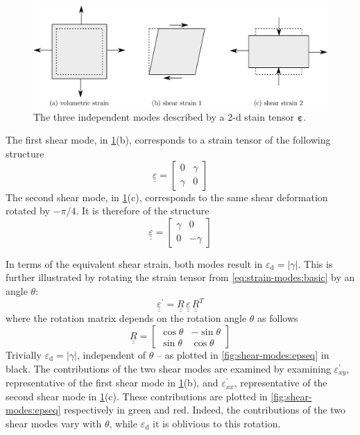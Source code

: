 \documentclass[fleqn]{goose-article}
\newcommand\T[1]{\underline{\bm{{#1}}}}
\begin{document}
\begin{figure}[htp]
    \centering
    \includegraphics[width=.7\textwidth]{figures/strain-modes_2d}
    \caption{The three independent modes described by a 2-d stain tensor $\T{\varepsilon}$.}
    \label{fig:strain-modes:2d}
\end{figure}

The first shear mode, in \cref{fig:strain-modes:2d}(b),
corresponds to a strain tensor of the following structure
\begin{equation}
    \label{eq:strain-modes:basic}
    \underline{\underline{\varepsilon}}
    =
    \begin{bmatrix}
        0 & \gamma \\
        \gamma & 0
    \end{bmatrix}
\end{equation}
The second shear mode, in \cref{fig:strain-modes:2d}(c),
corresponds to the same shear deformation rotated by $-\pi/4$.
It is therefore of the structure
\begin{equation}
    \underline{\underline{\varepsilon}}
    =
    \begin{bmatrix}
        \gamma & 0 \\
         0 & -\gamma
    \end{bmatrix}
\end{equation}

In terms of the equivalent shear strain, both modes result in $\varepsilon_\mathrm{d} = |\gamma|$.
This is further illustrated by rotating the strain tensor
from \cref{eq:strain-modes:basic} by an angle $\theta$:
\begin{equation}
    \underline{\underline{\varepsilon}}^\prime
    =
    \underline{\underline{R}} \,
    \underline{\underline{\varepsilon}} \,
    \underline{\underline{R}}^T
\end{equation}
where the rotation matrix depends on the rotation angle $\theta$ as follows
\begin{equation}
    \underline{\underline{R}}
    =
    \begin{bmatrix}
        \cos \theta & - \sin \theta \\
        \sin \theta & \cos \theta
    \end{bmatrix}
\end{equation}
Trivially $\varepsilon_\mathrm{d} = | \gamma |$, independent of $\theta$ --
as plotted in \cref{fig:shear-modes:epseq} in black.
The contributions of the two shear modes are examined by examining $\varepsilon^\prime_{xy}$,
representative of the first shear mode in \cref{fig:strain-modes:2d}(b),
and $\varepsilon^\prime_{xx}$,
representative of the second shear mode in \cref{fig:strain-modes:2d}(c).
These contributions are plotted in \cref{fig:shear-modes:epseq} respectively in green and red.
Indeed, the contributions of the two shear modes vary with $\theta$,
while $\varepsilon_\mathrm{d}$ it is oblivious to this rotation.
\end{document}
